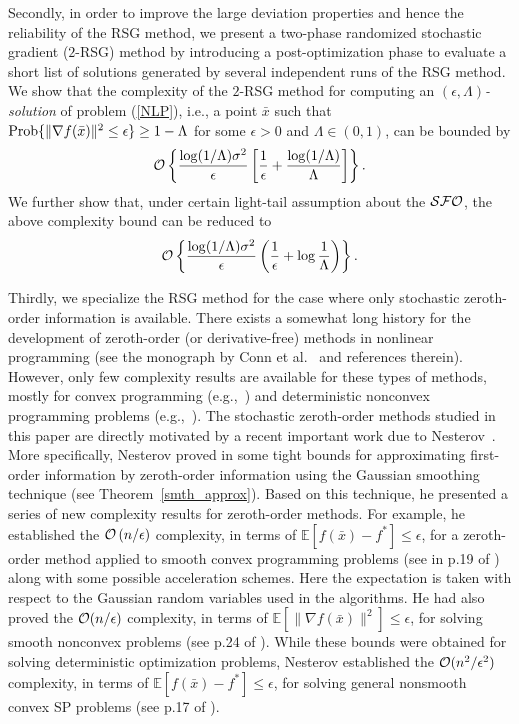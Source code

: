 \documentclass[final]{siamltex}
\def\eqnok#1{(\ref{#1})}
\newcommand{\bbe}{\mathbb{E}}
\def\Prob{{\hbox{\rm Prob}}}
\def\SFO{{\cal SFO}}
\begin{document}
Secondly, in order to improve the large deviation properties and hence the
reliability of the RSG method, we present a two-phase randomized stochastic gradient ($2$-RSG)
method by introducing a post-optimization phase
to evaluate a short list of solutions
generated by several independent runs of the RSG method.
We show that the complexity of the $2$-RSG method for
computing an {\sl $(\epsilon, \Lambda)$-solution} of problem \eqnok{NLP},
i.e.,  a point $\bar x$ such that
$\Prob\{\|\nabla f(\bar x)\|^2 \le \epsilon\} \ge 1-\Lambda$
for some $\epsilon > 0$ and $\Lambda \in (0,1)$,
can be bounded by
\[
{\cal O} \left\{
 \frac{\log(1/\Lambda) \sigma^2}{\epsilon}\left[\frac{1}{\epsilon}
 +  \frac{\log(1/\Lambda)}{\Lambda}\right]
\right\}.
\]
We further show that, under certain light-tail assumption about the $\SFO$,
the above complexity bound can be reduced to
\[
{\cal O} \left\{
 \frac{\log(1/\Lambda) \sigma^2}{\epsilon}\left(\frac{1}{\epsilon}
 +  \log\frac{1}{\Lambda}\right)
\right\}.
\]

Thirdly, we specialize the RSG method for the case where only stochastic
zeroth-order information is available. There exists a somewhat long history
for the development of zeroth-order (or derivative-free) methods in nonlinear programming
(see the monograph by Conn et al.~\cite{ConSchVic09} and references therein).
However, only few complexity results are available
for these types of methods, mostly for convex programming (e.g.,~\cite{nemyud:83,Nest11-1}) and
deterministic nonconvex programming problems (e.g.,~\cite{CarGouToi12,GarVic12,Nest11-1,Vinc12}).
The stochastic zeroth-order methods studied in this paper are directly motivated by
a recent important work due to Nesterov~\cite{Nest11-1}. More specifically, Nesterov proved in
\cite{Nest11-1} some tight bounds for approximating first-order
information by zeroth-order information using the Gaussian smoothing
technique (see Theorem~\ref{smth_approx}). Based on this technique,
he presented a series of new complexity results for zeroth-order methods.
For example, he established the 
${\cal O} \left(n /\epsilon \right)$ complexity, in terms of
$\bbe[f(\bar x) - f^*] \le \epsilon$, for a zeroth-order method applied to smooth convex programming problems (see in p.19 of \cite{Nest11-1})
along with some possible acceleration schemes. Here the expectation is taken with respect to the Gaussian random variables used in
the algorithms.
He had also proved the ${\cal O} (n/\epsilon)$ complexity, in terms of $\bbe[\|\nabla f (\bar x)\|^2] \le \epsilon$, 
for solving smooth nonconvex problems (see p.24 of \cite{Nest11-1}).
While these bounds were obtained for solving deterministic optimization
problems, Nesterov established the ${\cal O} (n^2/\epsilon^2)$
complexity, in terms of $\bbe[f(\bar x) - f^*] \le \epsilon$, for solving general nonsmooth convex
SP problems (see p.17 of \cite{Nest11-1}).
\end{document}
